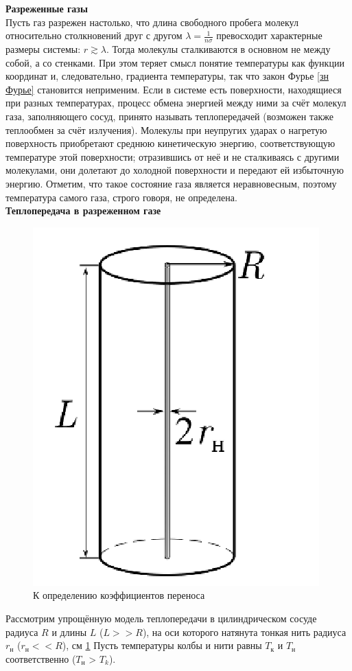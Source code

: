 \documentclass[12pt]{article}
\begin{document}
        \textbf{Разреженные газы}\\
         Пусть газ разрежен настолько, что длина свободного пробега молекул относительно столкновений друг
        с другом $\lambda = \frac{1}{n\sigma}$ превосходит характерные размеры системы: $r \gtrsim \lambda$. Тогда молекулы
        сталкиваются в основном не между собой, а со стенками. При этом теряет смысл понятие
        температуры как функции координат и, следовательно, градиента температуры, так что закон Фурье \ref{зн Фурье}
        становится неприменим. Если в системе есть поверхности, находящиеся при разных температурах, процесс обмена энергией
        между ними за счёт молекул газа, заполняющего сосуд, принято называть теплопередачей (возможен также теплообмен за счёт излучения). Молекулы
        при неупругих ударах о нагретую поверхность приобретают среднюю
        кинетическую энергию, соответствующую температуре этой поверхности;
        отразившись от неё и не сталкиваясь с другими молекулами, они долетают до
        холодной поверхности и передают ей избыточную энергию. Отметим, что такое состояние газа является неравновесным, поэтому
        температура самого газа, строго говоря, не определена.\\
        \textbf{Теплопередача в разреженном газе}\\
        \begin{figure}[H]
            \centering
            \includegraphics[width=0.4\linewidth]{task_geometry.png}
            \caption{К определению коэффициентов переноса}
            \label{fig:geom}
        \end{figure}
        Рассмотрим упрощённую модель теплопередачи в цилиндрическом сосуде радиуса $R$ и длины $L$ ($L >>R$),
        на оси которого натянута тонкая нить радиуса $r_\text{н}$ ($r_\text{н} << R$), см \ref{fig:geom}
        Пусть температуры колбы и нити равны $T_\text{к}$ и $T_\text{н}$ соответственно ($T_\text{н}$ > $T_k$).
\end{document}
